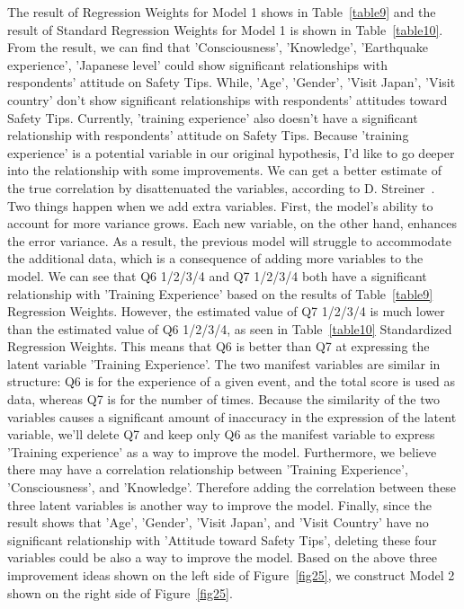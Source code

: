 The result of Regression Weights for Model 1 shows in Table~\ref{table9} and the result of Standard Regression Weights for Model 1 is shown in Table~\ref{table10}. From the result, we can find that 'Consciousness', 'Knowledge', 'Earthquake experience', 'Japanese level' could show significant relationships with respondents' attitude on Safety Tips. While, 'Age', 'Gender', 'Visit Japan', 'Visit country' don't show significant relationships with respondents' attitudes toward Safety Tips. Currently, 'training experience' also doesn't have a significant relationship with respondents' attitude on Safety Tips. Because 'training experience' is a potential variable in our original hypothesis, I'd like to go deeper into the relationship with some improvements. We can get a better estimate of the true correlation by disattenuated the variables, according to D. Streiner~\cite{Streiner2006BuildingAB}. Two things happen when we add extra variables. First, the model's ability to account for more variance grows. Each new variable, on the other hand, enhances the error variance. As a result, the previous model will struggle to accommodate the additional data, which is a consequence of adding more variables to the model. We can see that Q6 1/2/3/4 and Q7 1/2/3/4 both have a significant relationship with 'Training Experience' based on the results of Table~\ref{table9} Regression Weights. However, the estimated value of Q7 1/2/3/4 is much lower than the estimated value of Q6 1/2/3/4, as seen in Table~\ref{table10} Standardized Regression Weights. This means that Q6 is better than Q7 at expressing the latent variable 'Training Experience'. The two manifest variables are similar in structure: Q6 is for the experience of a given event, and the total score is used as data, whereas Q7 is for the number of times. Because the similarity of the two variables causes a significant amount of inaccuracy in the expression of the latent variable, we'll delete Q7 and keep only Q6 as the manifest variable to express 'Training experience' as a way to improve the model. Furthermore, we believe there may have a correlation relationship between 'Training Experience', 'Consciousness', and 'Knowledge'. Therefore adding the correlation between these three latent variables is another way to improve the model. Finally, since the result shows that 'Age', 'Gender', 'Visit Japan', and 'Visit Country' have no significant relationship with 'Attitude toward Safety Tips', deleting these four variables could be also a way to improve the model. Based on the above three improvement ideas shown on the left side of  Figure~\ref{fig25}, we construct Model 2 shown on the right side of Figure~\ref{fig25}.

